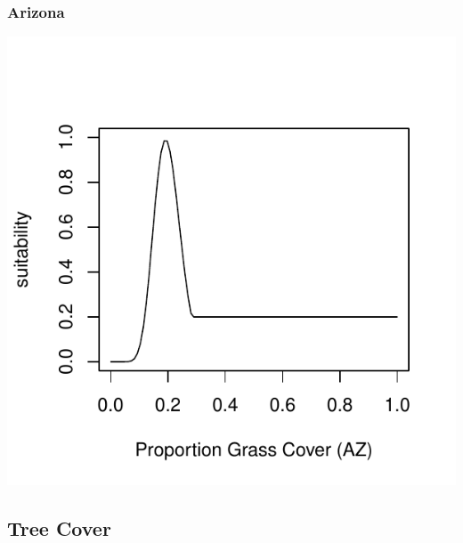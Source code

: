 \documentclass[12pt,letterpaper]{article}\usepackage{graphicx, color}
\makeatletter
\def\maxwidth{ %
  \ifdim\Gin@nat@width>\linewidth
    \linewidth
  \else
    \Gin@nat@width
  \fi
}
\newenvironment{knitrout}{}{} %
\makeatother
\begin{document}
\subsubsection{Arizona}
\begin{knitrout}
\color{fgcolor}\includegraphics[width=\maxwidth]{figure/Goodwin_Grass_Cover_AZ} 
\end{knitrout}

\subsection{Tree Cover}
\end{document}

